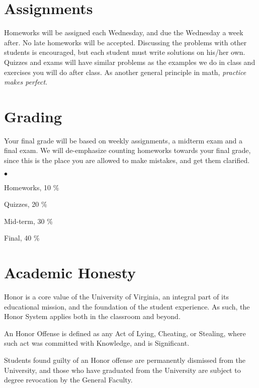\documentclass[margin,line]{res}
\newenvironment{list2}{
  \begin{list}{$\bullet$}{%
      \setlength{\itemsep}{0in}
      \setlength{\parsep}{0in} \setlength{\parskip}{0in}
      \setlength{\topsep}{0in} \setlength{\partopsep}{0in}
      \setlength{\leftmargin}{0.2in}}}{\end{list}}
\begin{document}
\begin{resume}
\section{\sc Assignments}
Homeworks will be assigned each Wednesday, and due the Wednesday a week after. No late homeworks will be accepted. Discussing the problems with other students is encouraged, but each student must write solutions on his/her own. Quizzes and exams will have similar problems as the examples we
do in class and exercises you will do after class. As another general principle in math,
\emph{practice makes perfect}.

\section{\sc Grading}
Your final grade will be based on weekly assignments, a midterm exam and a final exam. We will de-emphasize counting homeworks towards your final grade, since this is the place you are allowed to make mistakes, and get them clarified.
\\

\begin{list2}
\item Homeworks, 10 \%
\item Quizzes, 20 \%
\item Mid-term, 30 \%
\item Final, 40 \%
\end{list2}

\section{\sc Academic Honesty} 
Honor is a core value of the University of Virginia, an integral part of its educational mission, and the
foundation of the student experience. As such, the Honor System applies both in the classroom and
beyond.

An Honor Offense is defined as any Act of Lying, Cheating, or Stealing, where such act was committed with Knowledge, and is Significant.


Students found guilty of an Honor offense are permanently dismissed from the University, and those who have graduated from the University are subject to degree revocation by the General Faculty. 
\end{resume}
\end{document}
